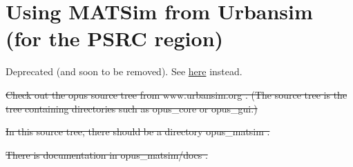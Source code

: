 \vfill\eject
\section{Using MATSim from Urbansim (for the PSRC region)}

Deprecated (and soon to be removed). See \href{http://matsim.org/extensions/matsim4urbansim}{here} instead.



\sout{Check  out the opus source tree from www.urbansim.org . (The source tree  is the tree containing directories such as opus\_core or opus\_gui.)}

\sout{In this source tree, there should be a directory opus\_matsim .}

\sout{There is documentation in opus\_matsim/docs .}

